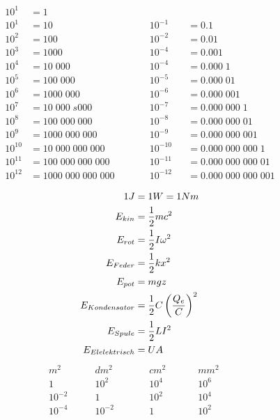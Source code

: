 \documentclass[twocolumn]{article}
\begin{document}
\begin{multicols}{2}


	\begin{alignat*}{3} 
	10^1 	&= 1 				  				  \\
	10^1 	&= 10	 			  &&10^{-1}		&&= 	0.1 \\
	10^2 	&= 100 			 	  &&10^{-2} 		&&= 	0.01 \\
	10^3 	&= 1000 		 	  &&10^{-4} 		&&= 	0.001 \\
	10^4 	&= 10\;000 		 	  &&10^{-4} 		&&= 	0.000\;1 \\
	10^5 	&= 100\;000 		 	  &&10^{-5} 		&&= 	0.000\;01 \\
	10^6 	&= 1000\;000 		 	  &&10^{-6} 		&&= 	0.000\;001 \\
	10^7 	&= 10\;000\;s000 	 	  &&10^{-7} 		&&= 	0.000\;000\;1 \\
	10^8 	&= 100\;000\;000 	 	  &&10^{-8} 		&&= 	0.000\;000\;01 \\
	10^9 	&= 1000\;000\;000 	 	  &&10^{-9} 		&&= 	0.000\;000\;001 \\
	10^10 	&= 10\;000\;000\;000 	 	  &&10^{-10} 		&&= 	0.000\;000\;000\;1 \\
	10^11 	&= 100\;000\;000\;000 	 	  &&10^{-11} 		&&= 	0.000\;000\;000\;01 \\
	10^12 	&= 1000\;000\;000\;000	\qquad 	  &&10^{-12} 		&&= 	0.000\;000\;000\;001 \\
	\end{alignat*}
\begin{align*}
	\LARGE 1J &= 1W = 1Nm \\
	\normalsize
	E_{kin} &= \frac{1}{2}mc^2 \\	
	E_{rot} &= \frac{1}{2}I\omega^2 \\
	E_{Feder} &= \frac{1}{2}kx^2 \\
	E_{pot} &= mgz \\
	E_{Kondensator} &= \frac{1}{2}C\left(\frac{Q_e}{C}\right)^2 \\
	E_{Spule}	&= \frac{1}{2}LI^2 \\
	E_{Elelektrisch} & = UA \\
\end{align*}
	\begin{alignat*}{3} 
		m^2 \quad & \quad dm^2 && \quad cm^2 && \quad mm^2 \\
		1\quad &\quad 10^2\quad &&\quad 10^4\quad &&\quad 10^6\quad \\
		10^{-2}\quad &\quad 1\quad &&\quad 10^{2}\quad &&\quad 10^{4}\quad \quad \\
		10^{-4}\quad &\quad 10^{-2}\quad &&\quad 1\quad &&\quad 10^{2}\quad \quad \\

\end{alignat*}
\end{multicols}
\end{document}
